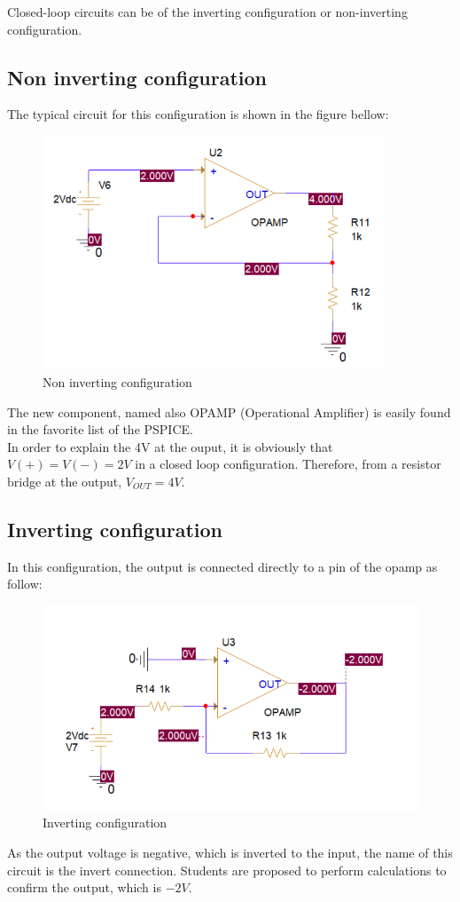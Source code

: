 Closed-loop circuits can be of the inverting configuration or non-inverting configuration.\\

\subsection{Non inverting configuration}

The typical circuit for this configuration is shown in the figure bellow:
\begin{figure}[!htp]
    \centering
    \includegraphics[width = 4in]{source/picture/bai_5/opam1.PNG}
    \caption{Non inverting configuration}
    \label{lab05_manual1}
\end{figure}

The new component, named also OPAMP (Operational Amplifier) is easily found in the favorite list of the PSPICE.\\

In order to explain the 4V at the ouput, it is obviously that $V(+) = V(-) = 2V$ in a closed loop configuration. Therefore, from a resistor bridge at the output, $V_{OUT} = 4V$.

\subsection{Inverting configuration} In this configuration, the output is connected directly to a pin of the opamp as follow:
\newpage
\begin{figure}[!htp]
    \centering
    \includegraphics[width = 4.5in]{source/picture/bai_5/opam2.PNG}
    \caption{Inverting configuration}
    \label{lab05_manual2}
\end{figure}
As the output voltage is negative, which is inverted to the input, the name of this circuit is the invert connection. Students are proposed to perform calculations to confirm the output, which is $-2V$.\\



